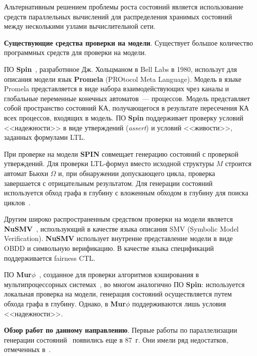 \documentclass[a4paper,notitlepage,14pt]{article}
\begin{document}
Альтернативным решением проблемы роста состояний является использование средств
параллельных вычислений для распределения хранимых состояний между несколькими узлами
вычислительной сети.


\textbf{Существующие средства проверки на модели}. Существует большое количество
программных средств для проверки на модели.

ПО \textbf{Spin}~\cite{SpinRoot}, разработнное Дж. Хольцманом в Bell Labs в 1980,
использут для описания модели язык \textbf{Promela} (PROtocol Meta Language). Модель в
языке Promela представляется в виде набора взаимодействующих чрез каналы и глобальные
переменные конечных автоматов~--- процессов. Модель представляет собой пространство
состояний КА, получающегося в результате пересечения КА всех процессов, входящих в
модель. ПО \textbf{Spin} поддерживает проверку условий <<надежности>> в виде утверждений
(\emph{assert}) и условий <<живости>>, заданных формулами LTL.

При проверке на модели \textbf{SPIN} совмещает генерацию состояний с проверкой
утверждений. Для проверки LTL-формул вместо исходной структуры $M$ строится автомат Бьюхи
$\Omega$ и, при обнаружении допускающего цикла, проверка завершается с отрицательным
результатом. Для генерации состояний используется обход графа в глубину с вложенным
обходом в глубину для поиска циклов~\cite{DBLP:conf/spin/FaragoS09}.

Другим широко распространенным средством проверки на модели является
\textbf{NuSMV}~\cite{Cimatti00nusmv:a}, использующий в качестве языка описания SMV
(Symbolic Model Verification). \textbf{NuSMV} использует внутренне представление модели в
виде OBDD и символьную верификацию. В качестве языка спецификаций поддерживается fairness
CTL.

ПО \textbf{Mur$\phi$}~\cite{Dill96murphi}, созданное для проверки алгоритмов кэширования в
мультипроцессорных системах~\cite{Dill96murphi}, во многом аналогично ПО \textbf{Spin}:
используется локальная проверка на модели, генерация состояний осуществляется путем обхода
графа в глубину. Однако, в \textbf{Mur$\phi$} поддерживаются лишь условия <<надежности>>.


\textbf{Обзор работ по данному направлению}. Первые работы по параллелизации
генерации состояний~\cite{Aggarwal87} появились еще в 87~г. Они имели ряд недостатков,
отмеченных в~\cite{Stern97parallelizingthe}.
\end{document}
